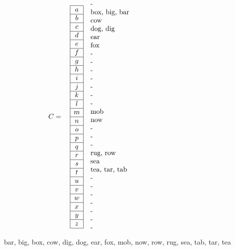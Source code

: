 \documentclass{article}
\begin{document}
\[
C = \quad
\begin{array}{|c|}
\hline
a \\ \hline
b \\ \hline
c \\ \hline
d \\ \hline
e \\ \hline
f \\ \hline
g \\ \hline
h \\ \hline
i \\ \hline
j \\ \hline
k \\ \hline
l \\ \hline
m \\ \hline
n \\ \hline
o \\ \hline
p \\ \hline
q \\ \hline
r \\ \hline
s \\ \hline
t \\ \hline
u \\ \hline
v \\ \hline
w \\ \hline
x \\ \hline
y \\ \hline
z \\ \hline
\end{array}
\quad
\begin{minipage}{6cm}
\raggedright %
-\\%
box, big, bar\\%
cow\\%
dog, dig\\%
ear\\%
fox\\%
-\\%
-\\%
-\\%
-\\%
-\\%
-\\%
-\\%
mob\\%
now\\%
-\\%
-\\%
-\\%
rug, row\\%
sea\\%
tea, tar, tab\\%
-\\%
-\\
-\\%
-\\%
-\\%
-\\%
-\\%
\end{minipage}
\]
\begin{tcolorbox}[title=Resposta, colframe=black, colback=white] %
    bar, big, box, cow, dig, dog, ear, fox, 
    mob, now, row, rug, sea, tab, tar, tea
\end{tcolorbox}
\end{document}
